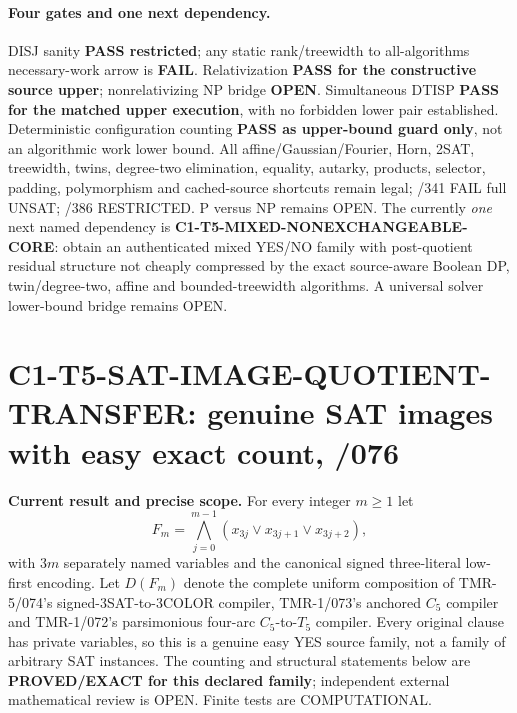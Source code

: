 \documentclass[11pt]{article}
\begin{document}
\paragraph{Four gates and one next dependency.}
DISJ sanity \textbf{PASS restricted}; any static rank/treewidth
to all-algorithms necessary-work arrow is \textbf{FAIL}.
Relativization \textbf{PASS for the constructive source upper};
nonrelativizing NP bridge \textbf{OPEN}.
Simultaneous DTISP \textbf{PASS for the matched upper execution},
with no forbidden lower pair established.
Deterministic configuration counting \textbf{PASS as upper-bound
guard only}, not an algorithmic work lower bound.
All affine/Gaussian/Fourier, Horn, 2SAT, treewidth, twins,
degree-two elimination, equality, autarky, products, selector,
padding, polymorphism and cached-source shortcuts remain legal;
/341 FAIL full UNSAT; /386 RESTRICTED. P versus NP remains OPEN.
The currently \emph{one} next named dependency is
\textbf{C1-T5-MIXED-NONEXCHANGEABLE-CORE}: obtain an
authenticated mixed YES/NO family with post-quotient
residual structure not cheaply compressed by the exact
source-aware Boolean DP, twin/degree-two, affine and
bounded-treewidth algorithms. A universal solver lower-bound
bridge remains OPEN.

\section{C1-T5-SAT-IMAGE-QUOTIENT-TRANSFER: genuine SAT images with easy exact count, /076}
\noindent\textbf{Current result and precise scope.}
For every integer $m\ge1$ let
\[
 F_m=\bigwedge_{j=0}^{m-1}
       (x_{3j}\vee x_{3j+1}\vee x_{3j+2}),
\]
with $3m$ separately named variables and the canonical signed
three-literal low-first encoding. Let $D(F_m)$ denote the complete
uniform composition of TMR-5/074's signed-3SAT-to-3COLOR compiler,
TMR-1/073's anchored $C_5$ compiler and TMR-1/072's
parsimonious four-arc $C_5$-to-$T_5$ compiler.
Every original clause has private variables, so this is a genuine
easy YES source family, not a family of arbitrary SAT instances.
The counting and structural statements below are
\textbf{PROVED/EXACT for this declared family}; independent external
mathematical review is OPEN. Finite tests are COMPUTATIONAL.
\end{document}
